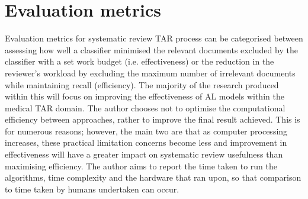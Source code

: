 \documentclass[10pt,oneside]{book}
\begin{document}


\section{Evaluation metrics}
Evaluation metrics for systematic review TAR process can be categorised between assessing how well a classifier minimised the relevant documents excluded by the classifier with a set work budget (i.e. effectiveness) or the reduction in the reviewer's workload by excluding the maximum number of irrelevant documents while maintaining recall (efficiency).  The majority of the research produced within this will focus on improving the effectiveness of AL models within the medical TAR domain. The author chooses not to optimise the computational efficiency between approaches, rather to improve the final result achieved. This is for numerous reasons; however, the main two are that as computer processing increases, these practical limitation concerns become less and improvement in effectiveness will have a greater impact on systematic review usefulness than maximising efficiency.  The author aims to report the time taken to run the algorithms, time complexity and the hardware that ran upon, so that comparison to time taken by humans undertaken can occur.
\end{document}
